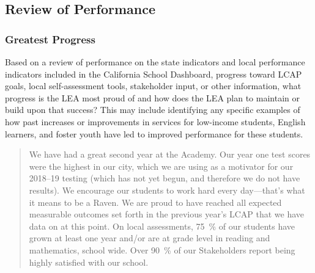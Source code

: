 \documentclass{article}
\newcounter{goal}[section] %
\begin{document}
\subsection{Review of Performance}

\subsubsection{Greatest Progress}
Based on a review of performance on the state indicators and local performance indicators included in the California School Dashboard, progress toward LCAP goals, local self-assessment tools, stakeholder input, or other information, what progress is the LEA most proud of and how does the LEA plan to maintain or build upon that success? This may include identifying any specific examples of how past increases or improvements in services for low-income students, English learners, and foster youth have led to improved performance for these students.
\begin{quotation}	
	We have had a great second year at the Academy. Our year one test scores were the highest in our city, which we are using as a motivator for our 2018--19 testing (which has not yet begun, and therefore we do not have results). We encourage our students to work hard every day---that's what it means to be a Raven. We are proud to have reached all expected measurable outcomes set forth in the previous year's LCAP that we have data on at this point. On local assessments, \SI{75}{\percent} of our students have grown at least one year and/or are at grade level in reading and mathematics, school wide. Over \SI{90}{\percent} of our Stakeholders report being highly satisfied with our school.
\end{quotation}
\end{document}
